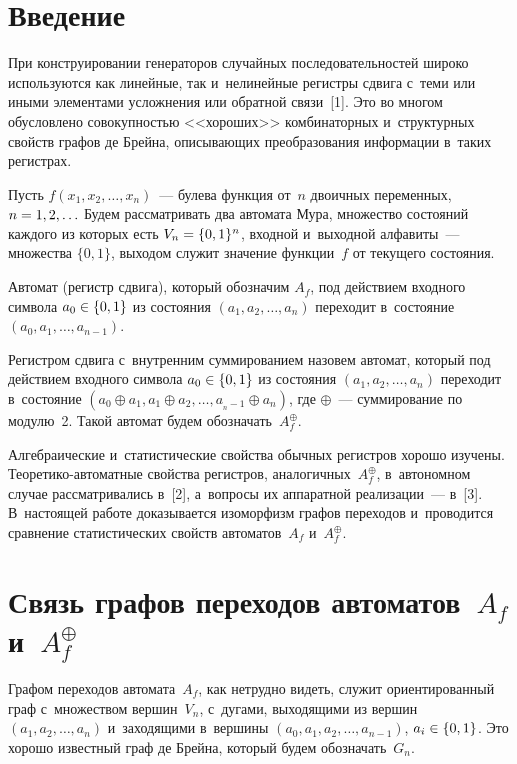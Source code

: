 \begin{multicols}{2}

\label{st\stat}
  
   
\section{Введение}

  При конструировании генераторов случайных последовательностей широко 
используются как линейные, так и~нелинейные регистры сдвига с~теми или 
иными элементами усложнения или обратной связи~[1]. Это во многом 
обусловлено совокупностью <<хороших>> комбинаторных и~структурных 
свойств графов де Брейна, описывающих преобразования информации в~таких 
регистрах.
  
  Пусть $f(x_1,x_2,\ldots , x_n)$~--- булева функция от~$n$ двоичных 
переменных, $n\hm= 1,2,\ldots$ Будем рас\-смат\-ри\-вать два автомата Мура, 
множество состояний каждого из которых есть $V_n\hm= \{0,1\}^n$, входной 
и~выходной алфавиты~--- множества $\{0,1\}$, выходом служит значение 
функции~$f$ от текущего состояния. 
  
  Автомат (регистр сдвига), который обозначим $A_f$, под действием 
входного символа $a_0\hm\in \{0,1\}$ из состояния $(a_1, a_2, \ldots ,a_n)$ 
переходит в~состояние $(a_0, a_1, \ldots , a_{n-1})$.
   
  Регистром сдвига с~внутренним суммированием назовем автомат, который 
под действием входного символа $a_0\hm\in \{0,1\}$ из состояния 
$(a_1,a_2,\ldots , a_n)$ переходит в~состояние $(a_0\oplus a_1, a_1\oplus 
a_2,\ldots , a_{_n-1}\oplus a_n)$, где $\oplus$~--- суммирование по модулю~2. 
Такой автомат будем обозначать~$A_f^{\oplus}$.
  
  Алгебраические и~статистические свойства обычных регистров хорошо 
изучены. Тео\-ре\-ти\-ко-ав\-то\-мат\-ные свойства регистров, 
аналогичных~$A_f^{\oplus}$, в~автономном случае рассматривались в~[2], 
а~вопросы их аппаратной реализации~--- в~[3]. В~настоящей работе доказывается 
изоморфизм графов переходов и~проводится сравнение статистических свойств 
автоматов~$A_f$ и~$A_f^{\oplus}$.
  
\section{Связь графов переходов автоматов~$A_f$ 
и~$A_f^{\oplus}$}

  Графом переходов автомата~$A_f$, как нетрудно видеть, служит 
ориентированный граф с~множеством вершин~$V_n$, с~дугами, выходящими 
из вершин $(a_1, a_2, \ldots , a_n)$ и~заходящими в~вершины 
$(a_0,a_1,a_2,\ldots , a_{n-1})$, $a_i\hm\in \{0,1\}$. Это хорошо известный граф 
де Брейна, который будем обозначать~$G_n$.
  

\end{multicols}
